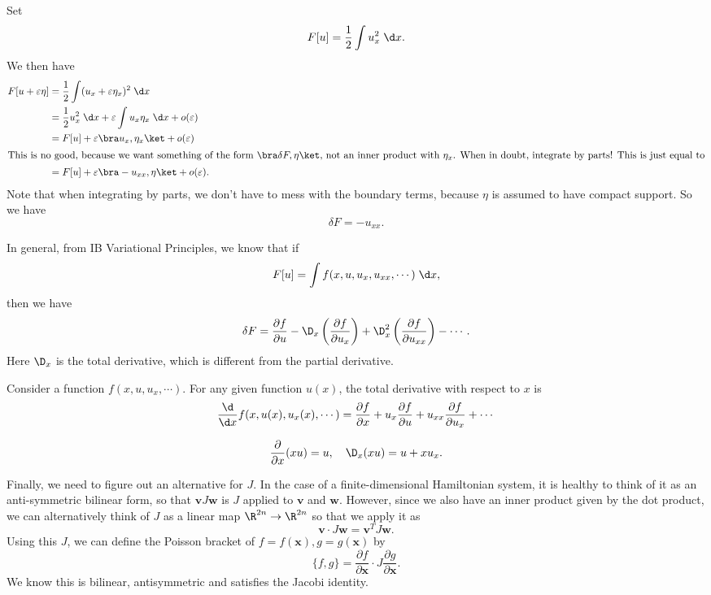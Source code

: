 \documentclass[a4paper]{article}
\begin{document}
\begin{eg}
  Set
  \[
    F[u] = \frac{1}{2} \int u_x^2 \;\d x.
  \]
  We then have
  \begin{align*}
    F[u + \varepsilon \eta] &= \frac{1}{2}\int (u_x + \varepsilon \eta_x)^2 \;\d x\\
    &= \frac{1}{2} u_x^2 \;\d x + \varepsilon \int u_x \eta_x \;\d x + o(\varepsilon)\\
    &= F[u] + \varepsilon \bra u_x, \eta_x\ket + o(\varepsilon)\\
    \intertext{This is no good, because we want something of the form $\bra \delta F, \eta\ket$, not an inner product with $\eta_x$. When in doubt, integrate by parts! This is just equal to}
    &= F[u] + \varepsilon \bra -u_{xx}, \eta\ket + o(\varepsilon).
  \end{align*}
  Note that when integrating by parts, we don't have to mess with the boundary terms, because $\eta$ is assumed to have compact support. So we have
  \[
    \delta F = - u_{xx}.
  \]
\end{eg}
In general, from IB Variational Principles, we know that if
\[
  F[u] = \int f(x, u, u_x, u_{xx}, \cdots)\;\d x,
\]
then we have
\[
  \delta F = \frac{\partial f}{\partial u} - \D_x\left(\frac{\partial f}{\partial u_x}\right) + \D_x^2 \left(\frac{\partial f}{\partial u_{xx}}\right) - \cdots.
\]
Here $\D_x$ is the total derivative, which is different from the partial derivative.
\begin{defi}
  Consider a function $f(x, u, u_x, \cdots)$. For any given function $u(x)$, the total derivative with respect to $x$ is
  \[
    \frac{\d}{\d x} f(x, u(x), u_x(x), \cdots) = \frac{\partial f}{\partial x} + u_x \frac{\partial f}{\partial u} + u_{xx} \frac{\partial f}{\partial u_x} + \cdots
  \]
\end{defi}

\begin{eg}
  \[
    \frac{\partial}{\partial x}(xu) = u,\quad \D_x (xu) = u + x u_x.
  \]
\end{eg}

Finally, we need to figure out an alternative for $J$. In the case of a finite-dimensional Hamiltonian system, it is healthy to think of it as an anti-symmetric bilinear form, so that $\mathbf{v}J\mathbf{w}$ is $J$ applied to $\mathbf{v}$ and $\mathbf{w}$. However, since we also have an inner product given by the dot product, we can alternatively think of $J$ as a linear map $\R^{2n} \to \R^{2n}$ so that we apply it as
\[
  \mathbf{v} \cdot J \mathbf{w} = \mathbf{v}^T J \mathbf{w}.
\]
Using this $J$, we can define the Poisson bracket of $f = f(\mathbf{x}), g = g(\mathbf{x})$ by
\[
  \{f, g\} = \frac{\partial f}{\partial \mathbf{x}} \cdot J \frac{\partial g}{\partial \mathbf{x}}.
\]
We know this is bilinear, antisymmetric and satisfies the Jacobi identity.
\end{document}
